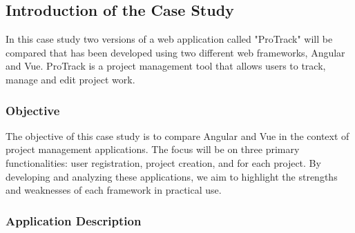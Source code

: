 \documentclass[conference]{IEEEtran}
\begin{document}





\subsection{Introduction of the Case Study}
In this case study two versions of a web application called "ProTrack" will be compared that has been developed using two different web frameworks, Angular and Vue. ProTrack is a project management tool that allows users to track, manage and edit project work.
\subsubsection{Objective}
The objective of this case study is to compare Angular and Vue in the context of project management applications. The focus will be on three primary functionalities: user registration, project creation, and  for each project. By developing and analyzing these applications, we aim to highlight the strengths and weaknesses of each framework in practical use.
\subsubsection{Application Description}
\end{document}
